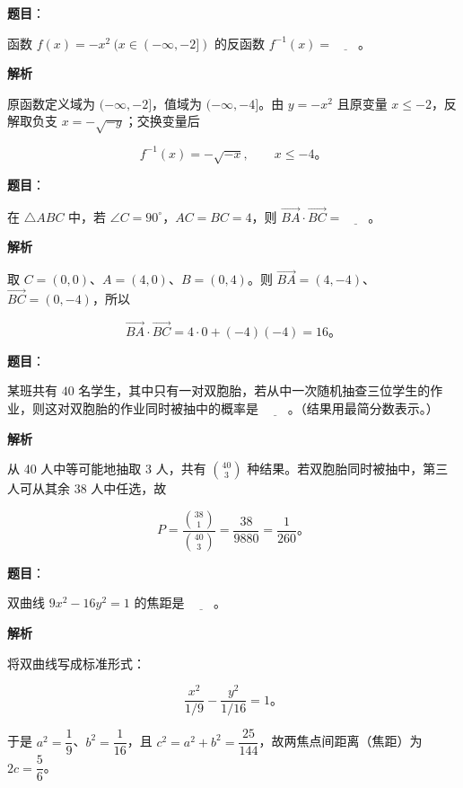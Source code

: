 \begin{answer}

\textbf{题目}：

函数 $f(x)=-x^2\ (x\in(-\infty,-2])$ 的反函数 $f^{-1}(x)=\underline{\qquad}$。

\textbf{解析}

原函数定义域为 $(-\infty,-2]$，值域为 $(-\infty,-4]$。由 $y=-x^2$ 且原变量 $x\le-2$，反解取负支 $x=-\sqrt{-y}$；交换变量后

\nopagebreak[4]
\[
f^{-1}(x)=-\sqrt{-x},\qquad x\le-4\mbox{。}
\]


\end{answer}
\begin{answer}

\textbf{题目}：

在 $\triangle ABC$ 中，若 $\angle C=90^\circ$，$AC=BC=4$，则 $\overrightarrow{BA}\cdot\overrightarrow{BC}=\underline{\qquad}$。

\textbf{解析}

取 $C=(0,0)$、$A=(4,0)$、$B=(0,4)$。则 $\overrightarrow{BA}=(4,-4)$、$\overrightarrow{BC}=(0,-4)$，所以

\nopagebreak[4]
\[
\overrightarrow{BA}\cdot\overrightarrow{BC}=4\cdot0+(-4)(-4)=16\mbox{。}
\]


\end{answer}
\begin{answer}

\textbf{题目}：

某班共有 $40$ 名学生，其中只有一对双胞胎，若从中一次随机抽查三位学生的作业，则这对双胞胎的作业同时被抽中的概率是 $\underline{\qquad}$。（结果用最简分数表示。）

\textbf{解析}

从 40 人中等可能地抽取 3 人，共有 $\binom{40}{3}$ 种结果。若双胞胎同时被抽中，第三人可从其余 38 人中任选，故

\nopagebreak[4]
\[
P=\frac{\binom{38}{1}}{\binom{40}{3}}=\frac{38}{9880}=\frac1{260}\mbox{。}
\]


\end{answer}
\begin{answer}

\textbf{题目}：

双曲线 $9x^2-16y^2=1$ 的焦距是 $\underline{\qquad}$。

\textbf{解析}

将双曲线写成标准形式：

\nopagebreak[4]
\[
\frac{x^2}{1/9}-\frac{y^2}{1/16}=1\mbox{。}
\]

于是 $a^2=\dfrac19$、$b^2=\dfrac1{16}$，且 $c^2=a^2+b^2=\dfrac{25}{144}$，故两焦点间距离（焦距）为 $2c=\dfrac56$。


\end{answer}
